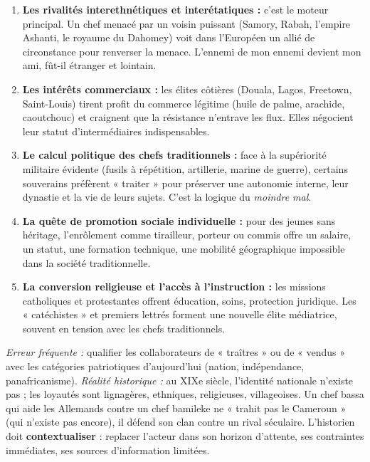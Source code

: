 \documentclass[11pt]{article}
\begin{document}
\begin{enumerate}
    \item \textbf{Les rivalités interethnétiques et interétatiques :} c'est le moteur principal. Un chef menacé par un voisin puissant (Samory, Rabah, l'empire Ashanti, le royaume du Dahomey) voit dans l'Européen un allié de circonstance pour renverser la menace. L'ennemi de mon ennemi devient mon ami, fût-il étranger et lointain.
    \item \textbf{Les intérêts commerciaux :} les élites côtières (Douala, Lagos, Freetown, Saint-Louis) tirent profit du commerce légitime (huile de palme, arachide, caoutchouc) et craignent que la résistance n'entrave les flux. Elles négocient leur statut d'intermédiaires indispensables.
    \item \textbf{Le calcul politique des chefs traditionnels :} face à la supériorité militaire évidente (fusils à répétition, artillerie, marine de guerre), certains souverains préfèrent « traiter » pour préserver une autonomie interne, leur dynastie et la vie de leurs sujets. C'est la logique du \emph{moindre mal}.
    \item \textbf{La quête de promotion sociale individuelle :} pour des jeunes sans héritage, l'enrôlement comme tirailleur, porteur ou commis offre un salaire, un statut, une formation technique, une mobilité géographique impossible dans la société traditionnelle.
    \item \textbf{La conversion religieuse et l'accès à l'instruction :} les missions catholiques et protestantes offrent éducation, soins, protection juridique. Les « catéchistes » et premiers lettrés forment une nouvelle élite médiatrice, souvent en tension avec les chefs traditionnels.
\end{enumerate}

\begin{attention}
\emph{Erreur fréquente :} qualifier les collaborateurs de « traîtres » ou de « vendus » avec les catégories patriotiques d'aujourd'hui (nation, indépendance, panafricanisme).
\emph{Réalité historique :} au XIXe siècle, l'identité nationale n'existe pas ; les loyautés sont lignagères, ethniques, religieuses, villageoises. Un chef bassa qui aide les Allemands contre un chef bamileke ne « trahit pas le Cameroun » (qui n'existe pas encore), il défend son clan contre un rival séculaire. L'historien doit \textbf{contextualiser} : replacer l'acteur dans son horizon d'attente, ses contraintes immédiates, ses sources d'information limitées.
\end{attention}
\end{document}

